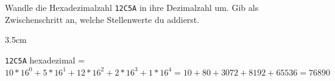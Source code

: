 \question[2]
Wandle die Hexadezimalzahl \texttt{12C5A} in ihre Dezimalzahl um.
Gib als Zwischenschritt an, welche Stellenwerte du addierst.

\begin{solutionbox}{3.5cm}

\texttt{12C5A} hexadezimal = $10*16^0 + 5*16^1 + 12*16^2 + 2*16^3 + 1*16^4 = 10 + 80 + 3072 + 8192 + 65536 = 76890$

\end{solutionbox}